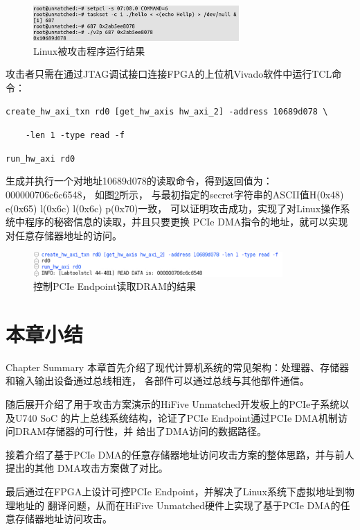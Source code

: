 \begin{figure}[ht]
	\centering
	\includegraphics[width=0.7\textwidth]{figs/unmatched.png}
	\caption{Linux被攻击程序运行结果}
	\label{fig:unmatched-output}
\end{figure}

攻击者只需在通过JTAG调试接口连接FPGA的上位机Vivado软件中运行TCL命令：

\verb|create_hw_axi_txn rd0 [get_hw_axis hw_axi_2] -address 10689d078 \|

\verb|    -len 1 -type read -f|

\verb|run_hw_axi rd0|

\noindent 生成并执行一个对地址10689d078的读取命令，得到返回值为：000000706c6c6548，
如图\ref{fig:vivado-output}所示，
与最初指定的secret字符串的ASCII值H(0x48) e(0x65) l(0x6c) l(0x6c) p(0x70)一致，
可以证明攻击成功，实现了对Linux操作系统中程序的秘密信息的读取，并且只要更换
PCIe DMA指令的地址，就可以实现对任意存储器地址的访问。

\begin{figure}[ht]
	\centering
	\includegraphics[width=0.85\textwidth]{figs/vivado.png}
	\caption{控制PCIe Endpoint读取DRAM的结果}
	\label{fig:vivado-output}
\end{figure}

\section{本章小结}{Chapter Summary}
本章首先介绍了现代计算机系统的常见架构：处理器、存储器和输入输出设备通过总线相连，
各部件可以通过总线与其他部件通信。

随后展开介绍了用于攻击方案演示的HiFive Unmatched开发板上的PCIe子系统以及U740 SoC
的片上总线系统结构，论证了PCIe Endpoint通过PCIe DMA机制访问DRAM存储器的可行性，并
给出了DMA访问的数据路径。

接着介绍了基于PCIe DMA的任意存储器地址访问攻击方案的整体思路，并与前人提出的其他
DMA攻击方案做了对比。

最后通过在FPGA上设计可控PCIe Endpoint，并解决了Linux系统下虚拟地址到物理地址的
翻译问题，从而在HiFive Unmatched硬件上实现了基于PCIe DMA的任意存储器地址访问攻击。


\newpage
